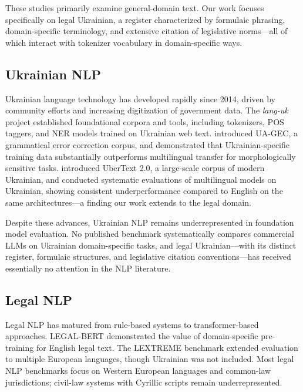 \documentclass[11pt,a4paper]{article}
\begin{document}
These studies primarily examine general-domain text. Our work focuses specifically on legal Ukrainian, a register characterized by formulaic phrasing, domain-specific terminology, and extensive citation of legislative norms---all of which interact with tokenizer vocabulary in domain-specific ways.

\subsection{Ukrainian NLP}

Ukrainian language technology has developed rapidly since 2014, driven by community efforts and increasing digitization of government data. The \textit{lang-uk} project \citep{languk2018} established foundational corpora and tools, including tokenizers, POS taggers, and NER models trained on Ukrainian web text. \citet{syvokon2023uagec} introduced UA-GEC, a grammatical error correction corpus, and demonstrated that Ukrainian-specific training data substantially outperforms multilingual transfer for morphologically sensitive tasks. \citet{chaplynskyi2023ukrbruk} introduced UberText 2.0, a large-scale corpus of modern Ukrainian, and conducted systematic evaluations of multilingual models on Ukrainian, showing consistent underperformance compared to English on the same architectures---a finding our work extends to the legal domain.

Despite these advances, Ukrainian NLP remains underrepresented in foundation model evaluation. No published benchmark systematically compares commercial LLMs on Ukrainian domain-specific tasks, and legal Ukrainian---with its distinct register, formulaic structures, and legislative citation conventions---has received essentially no attention in the NLP literature.

\subsection{Legal NLP}

Legal NLP has matured from rule-based systems to transformer-based approaches. LEGAL-BERT \citep{chalkidis2020legal} demonstrated the value of domain-specific pre-training for English legal text. The LEXTREME benchmark \citep{niklaus2023lextreme} extended evaluation to multiple European languages, though Ukrainian was not included. Most legal NLP benchmarks focus on Western European languages and common-law jurisdictions; civil-law systems with Cyrillic scripts remain underrepresented.
\end{document}

